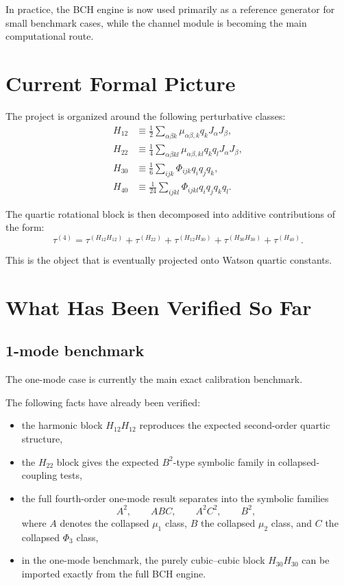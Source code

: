 \documentclass[11pt,a4paper]{article}
\begin{document}
In practice, the BCH engine is now used primarily as a reference generator for small benchmark cases, while the channel module is becoming the main computational route.

\section{Current Formal Picture}
The project is organized around the following perturbative classes:
\begin{align}
H_{12} &\equiv \frac12 \sum_{\alpha\beta k} \mu_{\alpha\beta,k} q_k J_\alpha J_\beta,\\
H_{22} &\equiv \frac14 \sum_{\alpha\beta kl} \mu_{\alpha\beta,kl} q_k q_l J_\alpha J_\beta,\\
H_{30} &\equiv \frac16 \sum_{ijk} \Phi_{ijk} q_i q_j q_k,\\
H_{40} &\equiv \frac1{24} \sum_{ijkl} \Phi_{ijkl} q_i q_j q_k q_l.
\end{align}

The quartic rotational block is then decomposed into additive contributions of the form:
\begin{equation}
\tau^{(4)} = \tau^{(H_{12}H_{12})} + \tau^{(H_{22})} + \tau^{(H_{12}H_{30})} + \tau^{(H_{30}H_{30})} + \tau^{(H_{40})}.
\end{equation}

This is the object that is eventually projected onto Watson quartic constants.

\section{What Has Been Verified So Far}
\subsection{1-mode benchmark}
The one-mode case is currently the main exact calibration benchmark.

The following facts have already been verified:
\begin{itemize}[leftmargin=*]
\item the harmonic block \(H_{12}H_{12}\) reproduces the expected second-order quartic structure,
\item the \(H_{22}\) block gives the expected \(B^2\)-type symbolic family in collapsed-coupling tests,
\item the full fourth-order one-mode result separates into the symbolic families
\[
A^2,\qquad AB C,\qquad A^2 C^2,\qquad B^2,
\]
where \(A\) denotes the collapsed \(\mu_1\) class, \(B\) the collapsed \(\mu_2\) class, and \(C\) the collapsed \(\Phi_3\) class,
\item in the one-mode benchmark, the purely cubic--cubic block \(H_{30}H_{30}\) can be imported exactly from the full BCH engine.
\end{itemize}
\end{document}
